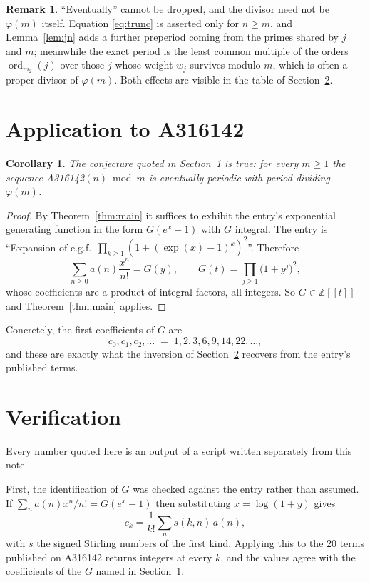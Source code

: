\documentclass[11pt,a4paper]{article}
\theoremstyle{plain}
\newtheorem{corollary}[theorem]{Corollary}
\theoremstyle{definition}
\newtheorem{remark}[theorem]{Remark}
\newcommand{\ord}{\operatorname{ord}}
\newcommand{\Z}{\mathbb{Z}}
\begin{document}
\begin{remark}
``Eventually'' cannot be dropped, and the divisor need not be $\varphi(m)$ itself.
Equation \eqref{eq:trunc} is asserted only for $n\ge m$, and Lemma~\ref{lem:jn} adds a
further preperiod coming from the primes shared by $j$ and $m$; meanwhile the exact period
is the least common multiple of the orders $\ord_{m_{2}}(j)$ over those $j$ whose weight
$w_{j}$ survives modulo $m$, which is often a proper divisor of $\varphi(m)$. Both effects
are visible in the table of Section~\ref{sec:ver}.
\end{remark}

\section{Application to A316142}\label{sec:apply}

\begin{corollary}\label{cor:this}
The conjecture quoted in Section~1 is true: for every $m\ge1$ the sequence
A316142$(n) \bmod m$ is eventually periodic with period dividing $\varphi(m)$.
\end{corollary}

\begin{proof}
By Theorem~\ref{thm:main} it suffices to exhibit the entry's exponential generating
function in the form $G(e^{x}-1)$ with $G$ integral. The entry is ``Expansion of e.g.f.\ $\prod_{k\ge1}(1+(\exp(x)-1)^{k})^{2}$''. Therefore
\[
\sum_{n\ge0}a(n)\frac{x^{n}}{n!}=G(y),\qquad G(t)=\prod_{j\ge1}\bigl(1+y^{j}\bigr)^{2} ,
\]
whose coefficients are a product of integral factors, all integers. So $G\in\Z[[t]]$ and
Theorem~\ref{thm:main} applies.
\end{proof}

Concretely, the first coefficients of $G$ are
\[
c_{0},c_{1},c_{2},\dots \;=\; 1, 2, 3, 6, 9, 14, 22, \dots ,
\]
and these are exactly what the inversion of Section~\ref{sec:ver} recovers from the
entry's published terms.

\section{Verification}\label{sec:ver}

Every number quoted here is an output of a script written separately from this note.

First, the identification of $G$ was checked against the entry rather than assumed. If
$\sum_{n}a(n)x^{n}/n!=G(e^{x}-1)$ then substituting $x=\log(1+y)$ gives
\[
c_{k}=\frac{1}{k!}\sum_{n}s(k,n)\,a(n),
\]
with $s$ the signed Stirling numbers of the first kind. Applying this to the
$20$ terms published on A316142 returns integers at every $k$, and the values
agree with the coefficients of the $G$ named in Section~\ref{sec:apply}.
\end{document}
